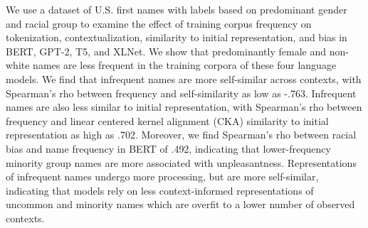 We use a dataset of U.S. first names with labels based on predominant gender and racial group to examine the effect of training corpus frequency on tokenization, contextualization, similarity to initial representation, and bias in BERT, GPT-2, T5, and XLNet. We show that predominantly female and non-white names are less frequent in the training corpora of these four language models. We find that infrequent names are more self-similar across contexts, with Spearman's rho between frequency and self-similarity as low as -.763. Infrequent names are also less similar to initial representation, with Spearman's rho between frequency and linear centered kernel alignment (CKA) similarity to initial representation as high as .702. Moreover, we find Spearman's rho between racial bias and name frequency in BERT of .492, indicating that lower-frequency minority group names are more associated with unpleasantness. Representations of infrequent names undergo more processing, but are more self-similar, indicating that models rely on less context-informed representations of uncommon and minority names which are overfit to a lower number of observed contexts.
